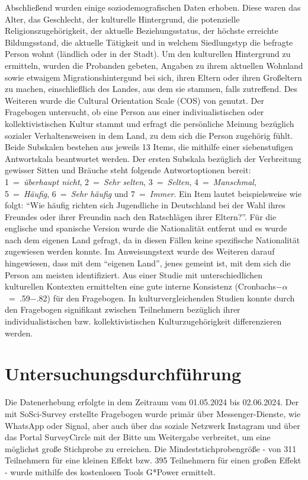 Abschließend wurden einige soziodemografischen Daten erhoben. Diese waren das Alter, das Geschlecht, der kulturelle Hintergrund, die potenzielle Religionszugehörigkeit, der aktuelle Beziehungsstatus, der höchste erreichte Bildungsstand, die aktuelle Tätigkeit und in welchem Siedlungstyp die befragte Person wohnt (ländlich oder in der Stadt). Um den kulturellen Hintergrund zu ermitteln, wurden die Probanden gebeten, Angaben zu ihrem aktuellen Wohnland sowie etwaigem Migrationshintergund bei sich, ihren Eltern oder ihren Großeltern zu machen, einschließlich des Landes, aus dem sie stammen, falls zutreffend. 
Des Weiteren wurde die Cultural Orientation Scale (COS) von \textcite{COS} genutzt. Der Fragebogen untersucht, ob eine Person aus einer indiviualistischen oder kollektivistischen Kultur stammt und erfragt die persönliche Meinung bezüglich sozialer Verhaltensweisen in dem Land, zu dem sich die Person zugehörig fühlt.
Beide Subskalen bestehen aus jeweils 13 Items, die mithilfe einer siebenstufigen Antwortskala beantwortet werden. Der ersten Subskala bezüglich der Verbreitung gewisser Sitten und Bräuche steht folgende Antwortoptionen bereit: 1~=~\textit{überhaupt nicht}, 2~=~\textit{Sehr selten}, 3~=~\textit{Selten}, 4~=~\textit{Manschmal}, 5~=~\textit{Häufig}, 6~=~\textit{Sehr häufig} und 7~=~\textit{Immer}. Ein Item lautet beispielsweise wie folgt: \enquote{Wie häufig richten sich Jugendliche in Deutschland bei der Wahl ihres Freundes oder ihrer Freundin nach den Ratschlägen ihrer Eltern?}. Für die englische und spanische Version wurde die Nationalität entfernt und es wurde nach dem eigenen Land gefragt, da in diesen Fällen keine spezifische Nationalität zugewiesen werden konnte. Im Anweisungstext wurde des Weiteren darauf hingewiesen, dass mit dem \enquote{eigenen Land}, jenes gemeint ist, mit dem sich die Person am meisten identifiziert.
Aus einer Studie mit unterschiedlichen kulturellen Kontexten ermittelten \textcite{COS} eine gute interne Konsistenz (Cronbachs$-$$\alpha$~=~.59$-$.82) für den Fragebogen. 
In kulturvergleichenden Studien konnte durch den Fragebogen signifikant zwischen Teilnehmern bezüglich ihrer individualistischen bzw. kollektivistischen Kulturzugehörigkeit differenzieren werden.


\section{Untersuchungsdurchführung}   \label{sec_3.4}
Die Datenerhebung erfolgte in dem Zeitraum vom 01.05.2024 bis 02.06.2024. Der mit SoSci-Survey erstellte Fragebogen wurde primär über Messenger-Dienste, wie WhatsApp oder Signal, aber auch über das soziale Netzwerk Instagram und über das Portal SurveyCircle mit der Bitte um Weitergabe verbreitet, um eine möglichst große Stichprobe zu erreichen. Die Mindeststichprobengröße - von 311 Teilnehmern für eine kleinen Effekt bzw. 395 Teilnehmern für einen großen Effekt - wurde mithilfe des kostenlosen Tools G*Power ermittelt. %


